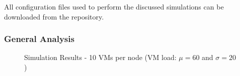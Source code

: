 All configuration files used to perform the discussed simulations can
be downloaded from the \vmps repository.

\subsubsection{General  Analysis}
\label{subsec:general-comparison}

\begin{figure}[bp]
\subcapcentertrue
{}
\caption{Simulation Results - 10 VMs per node (VM load: $\mu=60$ and $\sigma=20$)}
\label{fig:simulation-overview}
\end{figure}



